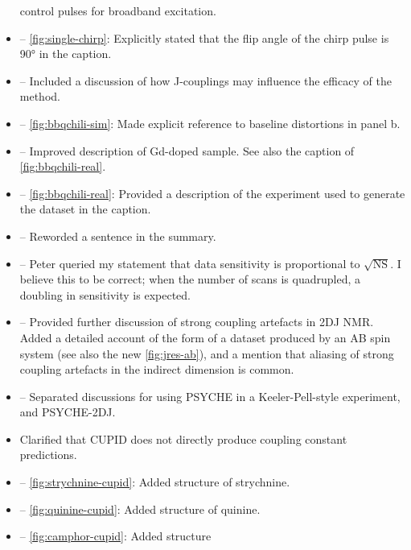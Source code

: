 \documentclass[12pt]{article}
\begin{document}
\begin{itemize}
            control pulses for broadband excitation.
        \item {} -- \cref{fig:single-chirp}: Explicitly
            stated that the flip angle of the chirp pulse is \ang{90} in the
            caption.
        \item {} -- Included a discussion of how
            J-couplings may influence the efficacy of the method.
        \item {} -- \cref{fig:bbqchili-sim}: Made
            explicit reference to baseline distortions in panel b.
        \item {} -- Improved description of Gd-doped sample.
            See also the caption of \cref{fig:bbqchili-real}.
        \item {} -- \cref{fig:bbqchili-real}:
            Provided a description of the experiment used to generate the
            dataset in the caption.
        \item {} -- Reworded a sentence in the summary.
        \item {} -- Peter queried my statement that data
            sensitivity is proportional to $\sqrt{\text{NS}}$. I believe this
            to be correct; when the number of scans is quadrupled, a doubling
            in sensitivity is expected.
        \item {} -- Provided further discussion
            of strong coupling artefacts in 2DJ NMR. Added a detailed
            account of the form of a dataset produced by an AB spin system (see
            also the new \cref{fig:jres-ab}), and a mention that aliasing of
            strong coupling artefacts in the indirect dimension is common.
        \item {} -- Separated discussions for using
            PSYCHE in a Keeler-Pell-style experiment, and PSYCHE-2DJ.
        \item {} Clarified that CUPID does not
            directly produce coupling constant predictions.
        \item {} -- \cref{fig:strychnine-cupid}: Added
            structure of strychnine.
        \item {} -- \cref{fig:quinine-cupid}: Added structure
            of quinine.
        \item {} -- \cref{fig:camphor-cupid}: Added structure

\end{itemize}
\end{document}
